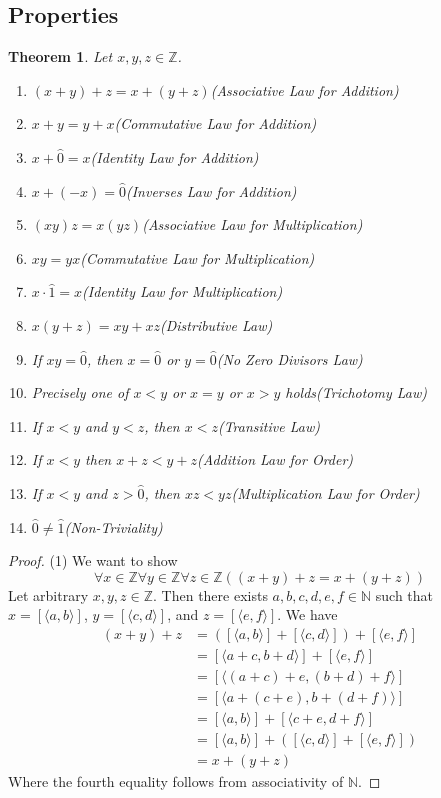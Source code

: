 \documentclass{report}
\newtheorem{theorem}[theo]{Theorem}
\begin{document}
\subsection{Properties}
\begin{theorem}\label{integer_arithmetic_1}
Let $x,y,z\in\mathbb Z$.
\begin{enumerate}
\item$(x+y)+z=x+(y+z)$\quad(Associative Law for Addition)
\item$x+y=y+x$\quad(Commutative Law for Addition)
\item$x+\hat0=x$\quad(Identity Law for Addition)
\item$x+(-x)=\hat0$\quad(Inverses Law for Addition)
\item$(xy)z=x(yz)$\quad(Associative Law for Multiplication)
\item$xy=yx$\quad(Commutative Law for Multiplication)
\item$x\cdot\hat1=x$\quad(Identity Law for Multiplication)
\item$x(y+z)=xy+xz$\quad(Distributive Law)
\item If $xy=\hat0$, then $x=\hat0$ or $y=\hat0$\quad(No Zero Divisors Law)
\item Precisely one of $x<y$ or $x=y$ or $x>y$ holds\quad(Trichotomy Law)
\item If $x<y$ and $y<z$, then $x<z$\quad(Transitive Law)
\item If $x<y$ then $x+z<y+z$\quad(Addition Law for Order)
\item If $x<y$ and $z>\hat0$, then $xz<yz$\quad(Multiplication Law for Order)
\item $\hat0\neq\hat1$\quad(Non-Triviality)
\end{enumerate}
\end{theorem}
\begin{proof}(1)
We want to show
\begin{equation*}
\forall x\in\mathbb Z\forall y\in\mathbb Z\forall z\in\mathbb Z((x+y)+z=x+(y+z))
\end{equation*}
Let arbitrary $x,y,z\in\mathbb Z$. Then there exists $a,b,c,d,e,f\in\mathbb N$ such that 
$x=[\langle a,b\rangle]$, $y=[\langle c,d\rangle]$, and $z=[\langle e,f\rangle]$.
We have
\begin{align*}
(x+y)+z&=([\langle a,b\rangle]+[\langle c,d\rangle])+[\langle e,f\rangle]\\
&=[\langle a+c,b+d\rangle]+[\langle e,f\rangle]\\
&=[\langle (a+c)+e,(b+d)+f\rangle]\\
&=[\langle a+(c+e),b+(d+f)\rangle]\\
&=[\langle a,b\rangle]+[\langle c+e,d+f\rangle]\\
&=[\langle a,b\rangle]+([\langle c,d\rangle]+[\langle e,f\rangle])\\
&=x+(y+z)
\end{align*}
Where the fourth equality follows from associativity of $\mathbb N$.
\end{proof}
\end{document}
